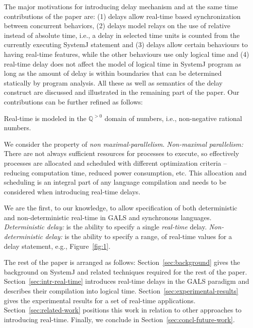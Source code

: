 The major motivations for introducing delay mechanism and at the same
time contributions of the paper are: (1) delays allow real-time based
synchronization between concurrent behaviors, (2) delays model relays on
the use of relative instead of absolute time, i.e., a delay in selected
time units is counted from the currently executing SystemJ statement and
(3) delays allow certain behaviours to having real-time features, while
the other behaviours use only logical time and (4) real-time delay does
not affect the model of logical time in SystemJ program as long as the
amount of delay is within boundaries that can be determined statically
by program analysis. All these as well as semantics of the delay
construct are discussed and illustrated in the remaining part of the
paper. Our contributions can be further refined as follows:
\begin{enumerate*}
\item Real-time is modeled in the $\mathbb{Q}^{>0}$ domain of numbers,
  i.e., non-negative rational numbers.
\item We consider the property of \textit{non
    maximal-parallelism}. \textit{Non-maximal parallelism:} There are
  not always sufficient resources for processes to execute, so
  effectively processes are allocated and scheduled with different
  optimization criteria -- reducing computation time, reduced power
  consumption, etc. This allocation and scheduling is an integral part
  of any language compilation and needs to be considered when
  introducing real-time delays.
\item We are the first, to our knowledge, to allow specification of both
  deterministic and non-deterministic real-time in GALS and synchronous
  languages. \textit{Deterministic delay:} is the ability to specify a
  single \textit{real-time} delay. \textit{Non-deterministic delay:} is
  the ability to specify a range, of real-time values for a delay
  statement, e.g., Figure~\ref{fig:1}.
\end{enumerate*}

The rest of the paper is arranged as follows:
Section~\ref{sec:background} gives the background on SystemJ and related
techniques required for the rest of the
paper. Section~\ref{sec:intr-real-time} introduces real-time delays in
the GALS paradigm and describes their compilation into logical
time. Section~\ref{sec:experimental-results} gives the experimental
results for a set of real-time
applications. Section~\ref{sec:related-work} positions this work in
relation to other approaches to introducing real-time. Finally, we
conclude in Section~\ref{sec:concl-future-work}.


